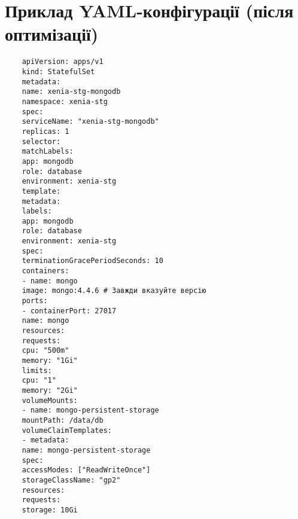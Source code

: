 \chapter{Приклад YAML-конфігурації (після оптимізації)}
\begin{verbatim}
	apiVersion: apps/v1
	kind: StatefulSet
	metadata:
	name: xenia-stg-mongodb
	namespace: xenia-stg
	spec:
	serviceName: "xenia-stg-mongodb"
	replicas: 1
	selector:
	matchLabels:
	app: mongodb
	role: database
	environment: xenia-stg
	template:
	metadata:
	labels:
	app: mongodb
	role: database
	environment: xenia-stg
	spec:
	terminationGracePeriodSeconds: 10
	containers:
	- name: mongo
	image: mongo:4.4.6 # Завжди вказуйте версію
	ports:
	- containerPort: 27017
	name: mongo
	resources:
	requests:
	cpu: "500m"
	memory: "1Gi"
	limits:
	cpu: "1"
	memory: "2Gi"
	volumeMounts:
	- name: mongo-persistent-storage
	mountPath: /data/db
	volumeClaimTemplates:
	- metadata:
	name: mongo-persistent-storage
	spec:
	accessModes: ["ReadWriteOnce"]
	storageClassName: "gp2"
	resources:
	requests:
	storage: 10Gi
\end{verbatim}

